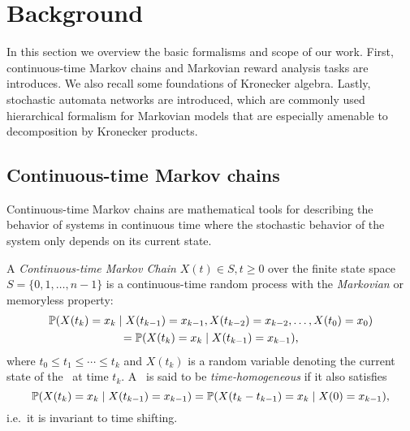 \chapter{Background}
\label{chap:background}

In this section we overview the basic formalisms and scope of our
work. First, continuous-time Markov chains and Markovian reward
analysis tasks are introduces. We also recall some foundations of
Kronecker algebra. Lastly, stochastic automata networks are
introduced, which are commonly used hierarchical formalism for
Markovian models that are especially amenable to decomposition by
Kronecker products.

\section{Continuous-time Markov chains}

Continuous-time Markov chains are mathematical tools for describing the
behavior of systems in continuous time where the stochastic behavior of
the system only depends on its current state.

\begin{dfn}
  A \emph{Continuous-time Markov Chain} \paren{\CTMC}
  $X(t) \in S, t \ge 0$ over the finite state
  space $S = \{0, 1, \ldots, n - 1\}$ is a continuous-time random
  process with the \emph{Markovian} or memoryless property:
  \begin{multline}\allowdisplaybreaks[0]
    \Pr(X(t_k) = x_k \mid X(t_{k - 1}) = x_{k - 1}, X(t_{k -
      2}) = x_{k - 2}, \ldots, X(t_{0}) = x_{0}) \\
    = \Pr(X(t_k) = x_k \mid X(t_{k - 1}) = x_{k - 1}) \text,
  \end{multline}
  where $t_0 \le t_1 \le \cdots \le t_k$ and $X(t_k)$ is a random variable denoting the current state of the \CTMC\ at time $t_k$. A \CTMC\ is said to be
  \emph{time-homogeneous} if it also satisfies
  \begin{equation}
    \Pr(X(t_k) = x_k \mid X(t_{k - 1}) = x_{k - 1}) = \Pr(X(t_k - t_{k -
      1}) = x_k \mid X(0) = x_{k - 1}) \text,
  \end{equation}
  i.e.~it is invariant to time shifting.
\end{dfn}

